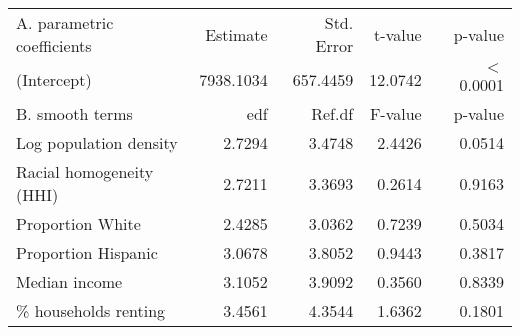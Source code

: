 \begin{table}[ht]
\centering
\begin{tabular}{lrrrr}
   \hline
A. parametric coefficients & Estimate & Std. Error & t-value & p-value \\ 
  (Intercept) & 7938.1034 & 657.4459 & 12.0742 & $<$ 0.0001 \\ 
   \hline
B. smooth terms & edf & Ref.df & F-value & p-value \\ 
  Log population density & 2.7294 & 3.4748 & 2.4426 & 0.0514 \\ 
  Racial homogeneity (HHI) & 2.7211 & 3.3693 & 0.2614 & 0.9163 \\ 
  Proportion White & 2.4285 & 3.0362 & 0.7239 & 0.5034 \\ 
  Proportion Hispanic & 3.0678 & 3.8052 & 0.9443 & 0.3817 \\ 
  Median income & 3.1052 & 3.9092 & 0.3560 & 0.8339 \\ 
  \% households renting & 3.4561 & 4.3544 & 1.6362 & 0.1801 \\ 
   \hline
\end{tabular}
\caption{ } 
\label{Demographic GAM}
\end{table}
